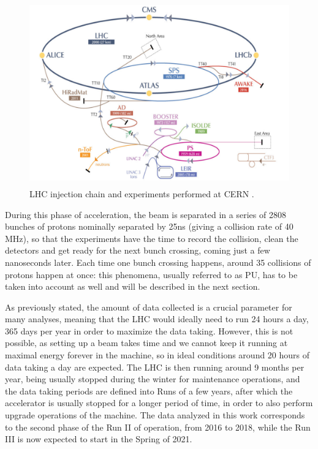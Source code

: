 \documentclass[a4paper, 10pt, openright]{report}
\begin{document}
\begin{figure}[htbp]
\begin{center}
\includegraphics[width=12cm, height=8cm]{figs/LHCChain.png}
\caption{LHC injection chain and experiments performed at \ac{CERN} \cite{AWAKE}.}
\label{fig:Chain}
\end{center}
\end{figure}

During this phase of acceleration, the beam is separated in a series of 2808 bunches of protons nominally separated by 25ns (giving a collision rate of 40 MHz), so that the experiments have the time to record the collision, clean the detectors and get ready for the next bunch crossing, coming just a few nanoseconds later. Each time one bunch crossing happens, around 35 collisions of protons happen at once: this phenomena, usually referred to as \ac{PU}, has to be taken into account as well and will be described in the next section.

As previously stated, the amount of data collected is a crucial parameter for many analyses, meaning that the \ac{LHC} would ideally need to run 24 hours a day, 365 days per year in order to maximize the data taking. However, this is not possible, as setting up a beam takes time and we cannot keep it running at maximal energy forever in the machine, so in ideal conditions around 20 hours of data taking a day are expected. The \ac{LHC} is then running around 9 months per year, being usually stopped during the winter for maintenance operations, and the data taking periods are defined into Runs of a few years, after which the accelerator is usually stopped for a longer period of time, in order to also perform upgrade operations of the machine. The data analyzed in this work corresponds to the second phase of the Run II of operation, from 2016 to 2018, while the Run III is now expected to start in the Spring of 2021.
\end{document}
